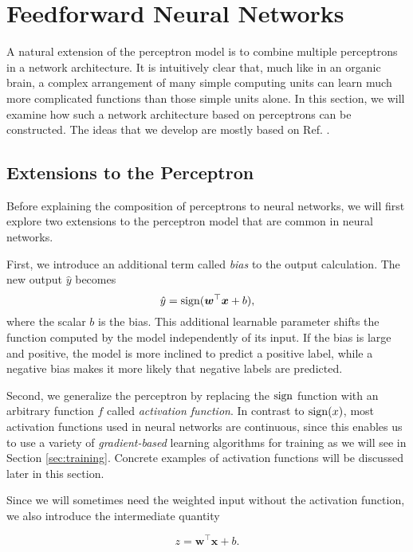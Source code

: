 \section{Feedforward Neural Networks}
\label{sec:feedforward_neural_networks}
A natural extension of the perceptron model is to combine multiple perceptrons in a network architecture. It is intuitively clear that, much like in an organic brain, a complex arrangement of many simple computing units can learn much more complicated functions than those simple units alone. In this section, we will examine how such a network architecture based on perceptrons can be constructed. The ideas that we develop are mostly based on Ref. \cite[Ch.\,6]{DBLP:books/daglib/0040158}.

\subsection{Extensions to the Perceptron}
Before explaining the composition of perceptrons to neural networks, we will first explore two extensions to the perceptron model that are common in neural networks.

First, we introduce an additional term called \emph{bias} to the output calculation. The new output $\hat{y}$ becomes
\begin{equation}
\hat{y} = \operatorname{sign}(\bm{w}^\top\bm{x} + b),
\end{equation}
where the scalar $b$ is the bias. This additional learnable parameter shifts the function computed by the model independently of its input. If the bias is large and positive, the model is more inclined to predict a positive label, while a negative bias makes it more likely that negative labels are predicted.

Second, we generalize the perceptron by replacing the $\operatorname{sign}$ function with an arbitrary function $f$ called \emph{activation function}. In contrast to $\operatorname{sign}(x)$, most activation functions used in neural networks are continuous, since this enables us to use a variety of \emph{gradient-based} learning algorithms for training as we will see in Section \ref{sec:training}. Concrete examples of activation functions will be discussed later in this section.

Since we will sometimes need the weighted input without the activation function, we also introduce the intermediate quantity

\begin{equation}
z = \bm{w}^\top\bm{x} + b.
\end{equation}


